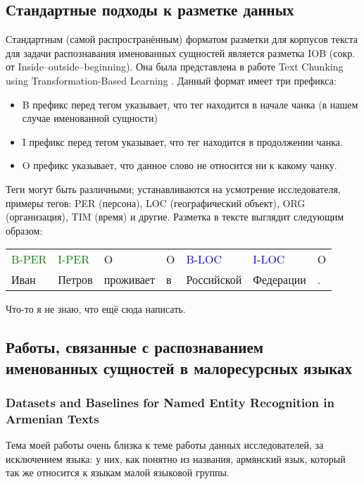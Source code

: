 \subsection{Стандартные подходы к разметке данных}

Стандартным (самой распространённым) форматом разметки для корпусов текста для задачи распознавания именованных сущностей является разметка IOB (сокр. от Inside–outside–beginning). Она была представлена в работе Text Chunking using Transformation-Based Learning \cite{DBLP:journals/corr/cmp-lg-9505040}. Данный формат имеет три префикса:
\begin{itemize}
\item B префикс перед тегом указывает, что тег находится в начале чанка (в нашем случае именованной сущности)
\item I префикс перед тегом указывает, что тег находится в продолжении чанка.
\item O префикс указывает, что данное слово не относится ни к какому чанку. 
\end{itemize}
 
Теги могут быть различными; устанавливаются на усмотрение исследователя, примеры тегов: PER (персона), LOC (географический объект), ORG (организация), TIM (время) и другие. Разметка в тексте выглядит следующим образом:

\begin{tabular}[h]{lllllll}
\textcolor{green}{B-PER} & \textcolor{green}{I-PER} & O & O & \textcolor{blue}{B-LOC} &  \textcolor{blue}{I-LOC} & O \\
Иван & Петров & проживает & в & Российской & Федерации & . \\
\end{tabular}

Что-то я не знаю, что ещё сюда написать.

\subsection{Работы, связанные с распознаванием именованных сущностей в малоресурсных языках}

\subsubsection{Datasets and Baselines for Named Entity Recognition in Armenian Texts}

Тема моей работы очень близка к теме работы данных исследователей, за исключением языка: у них, как понятно из названия, армянский язык, который так же относится к языкам малой языковой группы.

